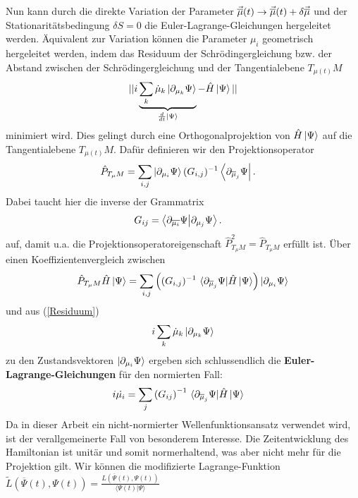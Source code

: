 Nun kann durch die direkte Variation der Parameter $\vec{\overline{\mu}}(t)\rightarrow \vec{\overline{\mu}}(t) + \delta\vec{\overline{\mu}}$ und der Stationaritätsbedingung 
$\delta S = 0$ die Euler-Lagrange-Gleichungen hergeleitet werden. Äquivalent zur Variation können die Parameter $\mu_i$ geometrisch hergeleitet
werden, indem das Residuum der Schrödingergleichung bzw. der Abstand zwischen der Schrödingergleichung und der Tangentialebene $T_{\mu(t)}M$ 
\begin{align}\label{Residuum}
    || i\underbrace{\sum_k \dot{\mu}_k\ket{\partial_{\mu_k}\Psi}}_{\frac{d}{dt}\ket{\Psi}} - \hat{H}\ket{\Psi} || 
\end{align}
minimiert wird. Dies gelingt durch eine Orthogonalprojektion von $\hat{H}\ket{\Psi}$ auf die Tangentialebene $T_{\mu(t)}M$. Dafür definieren wir den 
Projektionsoperator
\begin{align}
    \hat{P}_{T_{\mu}M} &= \sum_{i,j}\ket{\partial_{\mu_i}\Psi}(G_{i,j})^{-1}\bra{\partial_{\overline{\mu}_j}\Psi}.
\end{align}
Dabei taucht hier die inverse der Grammatrix 
\begin{align}
    G_{ij} &= \bra{\partial_{\overline{\mu_i}}\Psi}\ket{\partial_{\mu_j}\Psi}. 
\end{align}
auf, damit u.a. die Projektionsoperatoreigenschaft $\hat{P}_{T_{\mu}M}^2=\hat{P}_{T_{\mu}M}$ 
erfüllt ist. Über einen Koeffizientenvergleich zwischen
\begin{align}
    \hat{P}_{T_{\mu}M}\hat{H}\ket{\Psi} = \sum_{i,j}\left((G_{i,j})^{-1}\ 
    \langle\partial_{\muk_j}\Psi|\hat{H}\ket{\Psi}\right)\ket{\partial_{\mu_i}\Psi}
\end{align} 
und aus (\ref{Residuum})
\begin{align}
    i\sum_k \dot{\mu}_k\ket{\partial_{\mu_k}\Psi}
\end{align}
zu den Zustandsvektoren $\ket{\partial_{\mu_i}\Psi}$ ergeben sich schlussendlich die \textbf{Euler-Lagrange-Gleichungen} für den normierten Fall:
\begin{align}
    i\dot{\mu_i} &= \sum_{j}\left(G_{ij}\right)^{-1}\thinspace \langle\partial_{\overline{\mu}_j}\Psi|\hat{H}\ket{\Psi}
\end{align}
Da in dieser Arbeit ein nicht-normierter Wellenfunktionsansatz verwendet wird, ist der verallgemeinerte Fall von besonderem Interesse. Die Zeitentwicklung
des Hamiltonian ist unitär und somit normerhaltend, was aber nicht mehr für die Projektion gilt. Wir
können die modifizierte Lagrange-Funktion $\widetilde{L}(\overline{\Psi}(t), \Psi(t)) = \frac{L(\overline{\Psi}(t), \Psi(t))}{\langle \Psi(t)|\Psi\rangle}$
